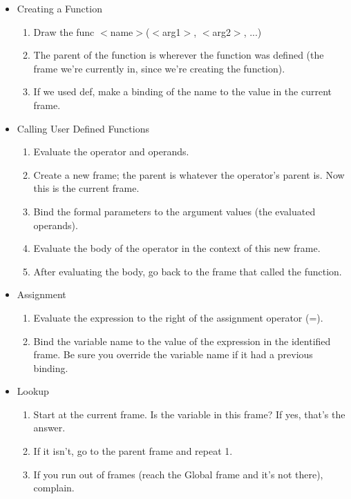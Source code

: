 \begin{blocksection}
\begin{itemize}
    \item Creating a Function
        \begin{enumerate}
            \setlength{\itemindent}{0.3em}
            \item Draw the func $<$name$>$($<$arg1$>$, $<$arg2$>$, ...)
            \item The parent of the function is wherever the function was defined (the frame we're currently in, since we're creating the function).
            \item If we used def, make a binding of the name to the value in the current frame.
        \end{enumerate}
    \item Calling User Defined Functions
		\begin{enumerate}
		    \setlength{\itemindent}{0.3em}
			\item Evaluate the operator and operands.
			\item Create a new frame; the parent is whatever the operator's parent is. Now this is the current frame.
			\item Bind the formal parameters to the argument values (the evaluated operands).
			\item Evaluate the body of the operator in the context of this new frame.
			\item After evaluating the body, go back to the frame that called the function.
		\end{enumerate}
    \item Assignment
		\begin{enumerate}
		    \setlength{\itemindent}{0.3em}
			\item Evaluate the expression to the right of the assignment operator (=).
			\item Bind the variable name to the value of the expression in the identified frame. Be sure you override the variable name if it had a previous binding.
		\end{enumerate}
	\item Lookup
		\begin{enumerate}
		\setlength{\itemindent}{0.3em}
			\item Start at the current frame. Is the variable in this frame? If yes, that's the answer.
    		\item If it isn't, go to the parent frame and repeat 1.
    		\item If you run out of frames (reach the Global frame and it's not there), complain.
	\end{enumerate}
\end{itemize}
\end{blocksection}
